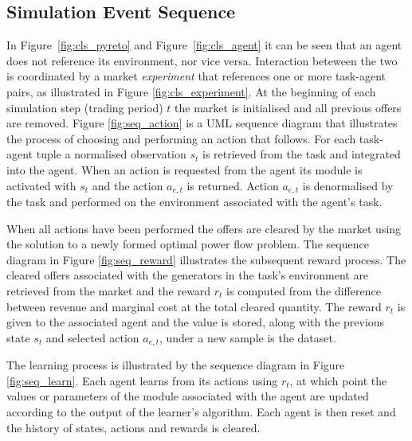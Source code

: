 \subsection{Simulation Event Sequence}
In Figure~\ref{fig:cls_pyreto} and Figure~\ref{fig:cls_agent} it can be seen
that an agent does not reference its environment, nor vice versa.  Interaction
beteween the two is coordinated by a market \textit{experiment} that references
one or more task-agent pairs, as illustrated in Figure \ref{fig:cls_experiment}.  At
the beginning of each simulation step (trading period) $t$ the market is
initialised and all previous offers are removed.  Figure \ref{fig:seq_action} is
a UML sequence diagram that illustrates the process of choosing and performing
an action that follows.  For each task-agent tuple a normalised observation
$s_t$ is retrieved from the task and integrated into the agent. When an action is
requested from the agent its module is activated with $s_t$ and the action
$a_{e,t}$ is returned.  Action $a_{e,t}$ is denormalised by the task
and performed on the environment associated with the agent's task.


When all actions have been performed the offers are cleared by the market using
the solution to a newly formed optimal power flow problem.  The sequence
diagram in Figure \ref{fig:seq_reward} illustrates the subsequent reward
process. The cleared offers associated with the generators in the task's environment are retrieved
from the market and the reward $r_t$ is computed from the difference between
revenue and marginal cost at the total cleared quantity.
The reward $r_t$ is given to the associated agent and the value is stored, along
with the previous state $s_t$ and selected action $a_{e,t}$, under a new sample
is the dataset.


The learning process is illustrated by the sequence diagram in Figure
\ref{fig:seq_learn}.  Each agent learns from its actions using $r_t$, at which
point the values or parameters of the module associated with the agent are
updated according to the output of the learner's algorithm.  Each agent is then
reset and the history of states, actions and rewards is cleared.

